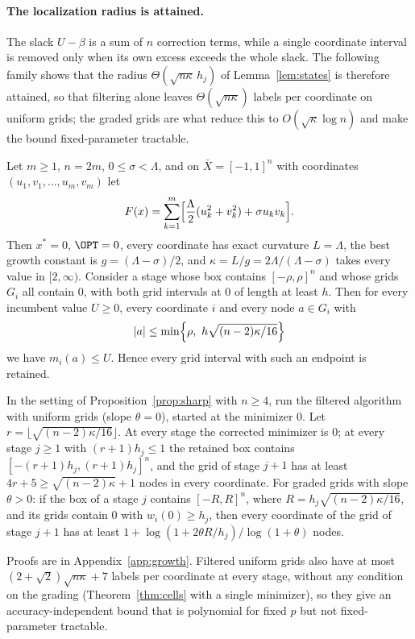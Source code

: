 
\paragraph{The localization radius is attained.}
The slack $U-\beta$ is a sum of $n$ correction terms, while a single coordinate
interval is removed only when its own excess exceeds the whole slack. The
following family shows that the radius $\Theta(\sqrt{n\kappa}\,h_j)$ of
Lemma~\ref{lem:states} is therefore attained, so that filtering alone leaves
$\Theta(\sqrt{n\kappa})$ labels per coordinate on uniform grids; the graded grids
are what reduce this to $O(\sqrt\kappa\log n)$ and make the bound
fixed-parameter tractable.

\begin{proposition}\label{prop:sharp}
Let $m\ge1$, $n=2m$, $0\le\sigma<\Lambda$, and on $\bar X=[-1,1]^n$ with
coordinates $(u_1,v_1,\dots,u_m,v_m)$ let
\[
F(x)=\sum_{k=1}^m\Bigl[\frac\Lambda2(u_k^2+v_k^2)+\sigma u_kv_k\Bigr].
\]
Then $x^*=0$, $\OPT=0$, every coordinate has exact curvature $L=\Lambda$, the
best growth constant is $g=(\Lambda-\sigma)/2$, and
$\kappa=L/g=2\Lambda/(\Lambda-\sigma)$ takes every value in $[2,\infty)$.
Consider a stage whose box contains $[-\rho,\rho]^n$ and whose grids
$G_i$ all contain $0$, with both grid intervals at $0$ of length at least $h$.
Then for every incumbent value $U\ge0$, every coordinate $i$ and every node
$a\in G_i$ with
\[
|a|\le\min\Bigl\{\rho,\ h\sqrt{(n-2)\kappa/16}\Bigr\}
\]
we have $m_i(a)\le U$. Hence every grid interval with such an endpoint is
retained.
\end{proposition}

\begin{corollary}
\label{cor:uniformgrid}
In the setting of Proposition~\ref{prop:sharp} with $n\ge4$, run the
filtered algorithm with uniform grids (slope $\theta=0$), started at the
minimizer $0$. Let $r=\lfloor\sqrt{(n-2)\kappa/16}\rfloor$. At every stage the
corrected minimizer is $0$; at every stage $j\ge1$ with $(r+1)h_j\le1$ the
retained box contains $[-(r+1)h_j,(r+1)h_j]^n$, and the grid of stage $j+1$
has at least $4r+5\ge\sqrt{(n-2)\kappa}+1$ nodes in every coordinate. For
graded grids with slope $\theta>0$: if the box of a stage $j$ contains
$[-R,R]^n$, where $R=h_j\sqrt{(n-2)\kappa/16}$, and its grids contain $0$
with $w_i(0)\ge h_j$, then every coordinate of the grid of stage $j+1$ has
at least $1+\log(1+2\theta R/h_j)/\log(1+\theta)$ nodes.
\end{corollary}

Proofs are in Appendix~\ref{app:growth}. Filtered uniform grids also have at
most $(2+\sqrt2)\sqrt{n\kappa}+7$ labels per coordinate at every stage, without
any condition on the grading (Theorem~\ref{thm:cells} with a single minimizer),
so they give an accuracy-independent bound that is polynomial for fixed $p$
but not fixed-parameter tractable.
